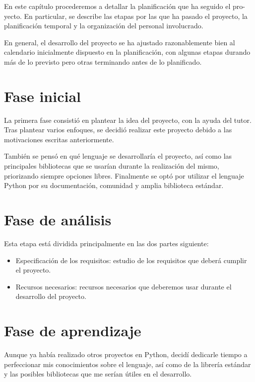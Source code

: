 En este capítulo procederemos a detallar la planificación que ha seguido el pro-
yecto. En particular, se describe las etapas por las que
ha pasado el proyecto, la planificación temporal y la organización del personal
involucrado.

En general, el desarrollo del proyecto se ha ajustado razonablemente bien al calendario
inicialmente dispuesto en la planificación, con algunas etapas durando
más de lo previsto pero otras terminando antes de lo planificado.

\section{Fase inicial}

La primera fase consistió en plantear la idea del proyecto, con la ayuda del tutor. Tras plantear
varios enfoques, se decidió realizar este proyecto debido a las motivaciones escritas anteriormente.

También se pensó en qué lenguaje se desarrollaría el proyecto, así como las principales bibliotecas que
se usarían durante la realización del mismo, priorizando siempre opciones libres. Finalmente se optó por
utilizar el lenguaje Python por su documentación, comunidad y amplia biblioteca estándar.

\section{Fase de análisis}

Esta etapa está dividida principalmente en las dos partes siguiente:

\begin{itemize}
\item Especificación de los requisitos: estudio de los requisitos que deberá cumplir el proyecto.
\item Recursos necesarios: recursos necesarios que deberemos usar durante el desarrollo del proyecto.
\end{itemize}

\section{Fase de aprendizaje}

Aunque ya había realizado otros proyectos en Python, decidí dedicarle tiempo a perfeccionar mis conocimientos
sobre el lenguaje, así como de la librería estándar y las posibles bibliotecas que me serían útiles en el desarrollo.

